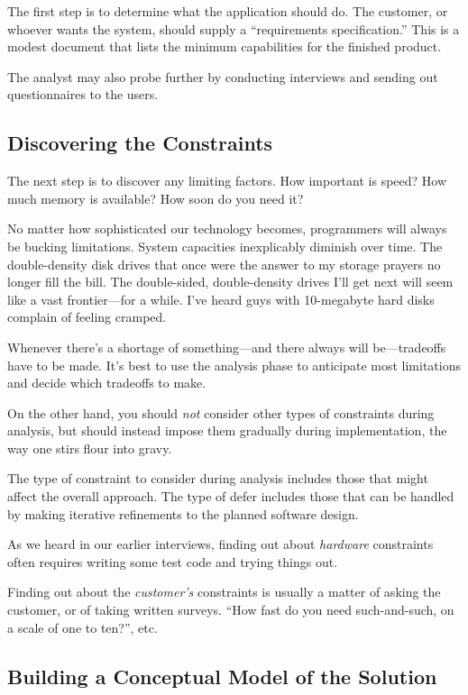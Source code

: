 The first step is to determine what the application should
do. The customer, or whoever wants the system, should supply a
``requirements specification.'' This is a modest document that lists
the minimum capabilities for the finished product.

The analyst may also probe further by conducting interviews and
sending out questionnaires to the users.

\subsection{Discovering the Constraints}

The next step is to discover any limiting factors. How important is
speed? How much memory is available? How soon do you need it?

No matter how sophisticated our technology becomes, programmers will
always be bucking limitations. System capacities inexplicably
diminish over time. The double-density disk drives that once were the
answer to my storage prayers no longer fill the bill. The
double-sided, double-density drives I'll get next will seem like a
vast frontier---for a while. I've heard guys with 10-megabyte hard
disks complain of feeling cramped.

Whenever there's a shortage of something---and there always will
be---tradeoffs have to be made. It's best to use the analysis phase to
anticipate most limitations and decide which tradeoffs to make.

On the other hand, you should \emph{not} consider other types of
constraints during analysis, but should instead impose them gradually
during implementation, the way one stirs flour into gravy.

The type of constraint to consider during analysis includes those that
might affect the overall approach. The type of defer includes those
that can be handled by making iterative refinements to the planned
software design.

As we heard in our earlier interviews, finding out about \emph{hardware}
constraints often requires writing
some test code and trying things out.

Finding out about the \emph{customer's} constraints is usually a
matter of asking the customer, or of taking written surveys. ``How
fast do you need such-and-such, on a scale of one to ten?'', etc.

\subsection{Building a Conceptual Model of the Solution}

